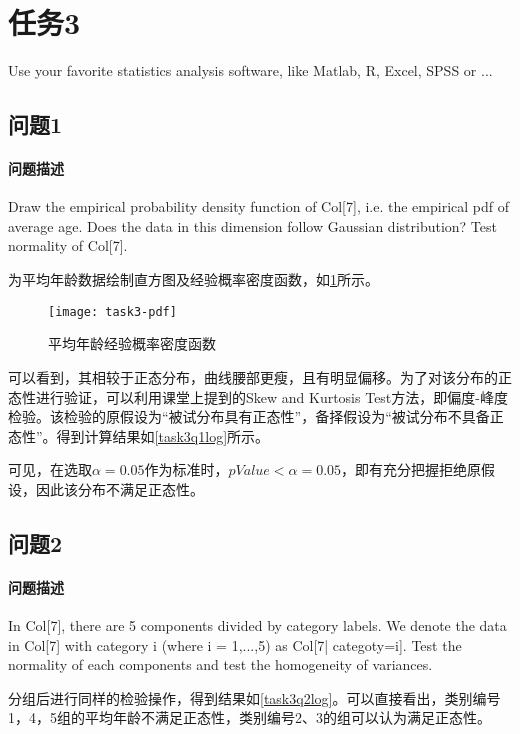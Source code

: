 \documentclass[a4paper,12pt]{article}
\begin{document}
    \section{任务3} %
    Use your favorite statistics analysis software, like Matlab, R, Excel, SPSS or ...
    \subsection{问题1} %
    \paragraph{问题描述} Draw the empirical probability density function of Col[7], i.e. the empirical pdf of average age. Does the data in this dimension follow Gaussian distribution? Test normality of Col[7].

    为平均年龄数据绘制直方图及经验概率密度函数，如\cref{fig:task3-pdf}所示。
    \begin{figure}[htbp]
        \centering
        \texttt{[image: task3-pdf]}
        \caption{平均年龄经验概率密度函数}
        \label{fig:task3-pdf}
    \end{figure}

    可以看到，其相较于正态分布，曲线腰部更瘦，且有明显偏移。为了对该分布的正态性进行验证，可以利用课堂上提到的Skew and Kurtosis Test方法，即偏度-峰度检验。该检验的原假设为“被试分布具有正态性”，备择假设为“被试分布不具备正态性”。得到计算结果如\cref{task3q1log}所示。
    

    可见，在选取$\alpha=0.05$作为标准时，$pValue<\alpha=0.05$，即有充分把握拒绝原假设，因此该分布不满足正态性。

    \subsection{问题2} %
    \paragraph{问题描述} In Col[7], there are 5 components divided by category labels. We denote the data in Col[7] with category i (where i = 1,...,5) as Col[7| categoty=i]. Test the normality of each components and test the homogeneity of variances.

    分组后进行同样的检验操作，得到结果如\cref{task3q2log}。可以直接看出，类别编号1，4，5组的平均年龄不满足正态性，类别编号2、3的组可以认为满足正态性。
    
\end{document}
